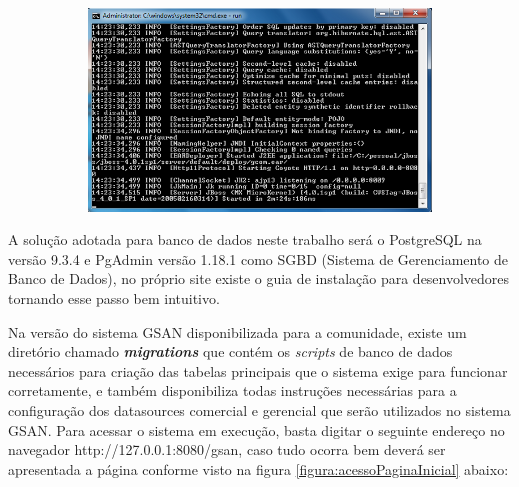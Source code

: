 \begin{figure}[H]
	\centering
	\caption{\textbf{Executando o sistema GSAN}}	
	\label{figura:execucaoSistemaGSAN}
	\begin{subfigure}[H]{\textwidth}
		\centering
	\includegraphics{figuras/executando_jboss.png}	
	\end{subfigure}
\end{figure}	



A solução adotada para banco de dados neste trabalho será o PostgreSQL na versão 9.3.4 e PgAdmin versão 1.18.1 como SGBD (Sistema de Gerenciamento de Banco de Dados), no próprio site existe o guia de instalação para desenvolvedores tornando esse passo bem intuitivo.

Na versão do sistema GSAN disponibilizada para a comunidade, existe um diretório chamado \textbf{\textit{migrations}} que contém os \textit{scripts} de banco de dados necessários para criação das tabelas principais que o sistema exige para funcionar corretamente, e também disponibiliza todas instruções necessárias para a configuração dos datasources comercial e gerencial que serão utilizados no sistema GSAN.
Para acessar o sistema em execução, basta digitar o seguinte endereço no navegador http://127.0.0.1:8080/gsan, caso tudo ocorra bem deverá ser apresentada a página conforme visto na figura \ref{figura:acessoPaginaInicial} abaixo:

